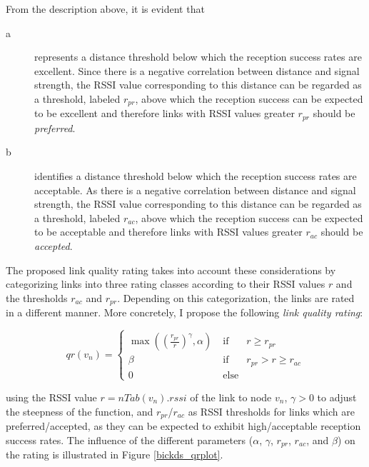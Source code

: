 From the description above, it is evident that 

\begin{description}

\item[a] represents a distance threshold below which the reception success rates are excellent. Since there is a negative correlation between distance and signal strength, the RSSI value corresponding to this distance can be regarded as a threshold, labeled $r_{pr}$, above which the reception success can be expected to be excellent and therefore links with RSSI values greater $r_{pr}$ should be \emph{preferred}.

\item[b] identifies a distance threshold below which the reception success rates are acceptable. As there is a negative correlation between distance and signal strength, the RSSI value corresponding to this distance can be regarded as a threshold, labeled $r_{ac}$, above which the reception success can be expected to be acceptable and therefore links with RSSI values greater $r_{ac}$ should be \emph{accepted}.

\end{description}



The proposed link quality rating takes into account these considerations by categorizing links into three rating classes according to their RSSI values $r$ and the thresholds $r_{ac}$ and $r_{pr}$. Depending on this categorization, the links are rated in a different manner. More concretely, I propose the following \emph{link quality rating}:

\begin{equation}\label{qr}
	qr(v_n)= \left\{ \begin{array}{rll}
	 	\max((\frac{r_{pr}}{r})^\gamma,\alpha) & \; \mbox{if} \; & r \geq r_{pr}\\
	 	\beta & \; \mbox{if} \; & r_{pr} > r \geq r_{ac}  \\
	 	0 & \; \mbox{else}
	 	\end{array}\right.
\end{equation}


using the RSSI value $r=nTab(v_n).rssi$ of the link to node $v_n$, $\gamma >0$ to adjust the steepness of the function, and $r_{pr}$/$r_{ac}$ as RSSI thresholds for links which are preferred/accepted, as they can be expected to exhibit high/acceptable reception success rates.  The influence of the different parameters ($\alpha$, $\gamma$, $r_{pr}$, $r_{ac}$, and $\beta$) on the rating is illustrated in Figure \ref{bickds_qrplot}.

